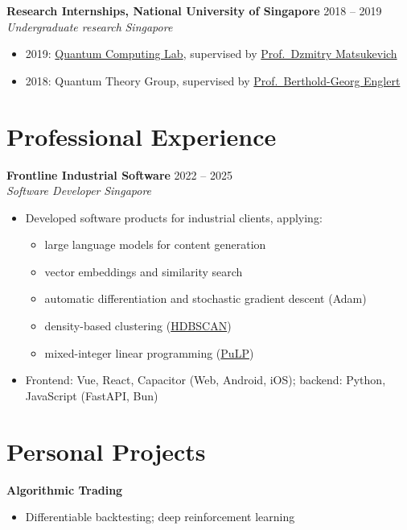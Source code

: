 \documentclass[11pt,a4paper]{article}
\newcommand{\entry}[4]{%
  \textbf{#1} \hfill #2\\
  \textit{#3} \hfill \textit{#4}\par\vspace{2pt}}
\begin{document}
\entry{Research Internships, National University of Singapore}{2018 -- 2019}
      {Undergraduate research}{Singapore}
\begin{itemize}
  \item 2019: \href{https://ions-sg.org/index.html}{Quantum Computing Lab},
        supervised by
        \href{https://scholar.google.com/citations?user=B4X3nCMAAAAJ&hl=en}{Prof.\ Dzmitry Matsukevich}
  \item 2018: Quantum Theory Group, supervised by
        \href{https://scholar.google.com/citations?user=ttUoRO4AAAAJ&hl=en}{Prof.\ Berthold-Georg Englert}
\end{itemize}

\section{Professional Experience}

\entry{Frontline Industrial Software}{2022 -- 2025}
      {Software Developer}{Singapore}
\begin{itemize}
  \item Developed software products for industrial clients, applying:
  \begin{itemize}
    \item large language models for content generation
    \item vector embeddings and similarity search
    \item automatic differentiation and stochastic gradient descent (Adam)
    \item density-based clustering (\href{https://github.com/scikit-learn-contrib/hdbscan}{HDBSCAN})
    \item mixed-integer linear programming (\href{https://github.com/coin-or/pulp}{PuLP})
  \end{itemize}
  \item Frontend: Vue, React, Capacitor (Web, Android, iOS);
        backend: Python, JavaScript (FastAPI, Bun)
\end{itemize}

\section{Personal Projects}

\textbf{Algorithmic Trading}
\begin{itemize}
  \item Differentiable backtesting; deep reinforcement learning
\end{itemize}
\vspace{4pt}
\end{document}
